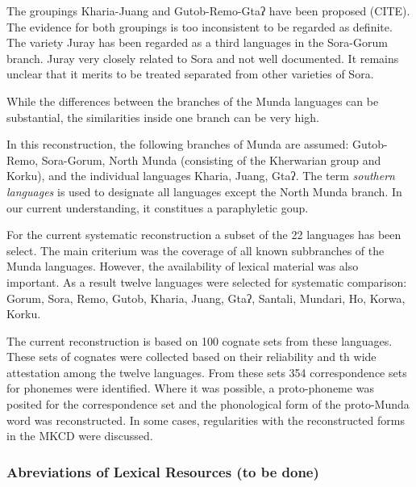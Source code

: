 \documentclass[a4paper,]{article}
\begin{document}
The groupings Kharia-Juang and Gutob-Remo-Gtaʔ have been proposed
(CITE). The evidence for both groupings is too inconsistent to be
regarded as definite. The variety Juray has been regarded as a third
languages in the Sora-Gorum branch. Juray very closely related to Sora
and not well documented. It remains unclear that it merits to be treated
separated from other varieties of Sora.

While the differences between the branches of the Munda languages can be
substantial, the similarities inside one branch can be very high.

In this reconstruction, the following branches of Munda are assumed:
Gutob-Remo, Sora-Gorum, North Munda (consisting of the Kherwarian group
and Korku), and the individual languages Kharia, Juang, Gtaʔ. The term
\emph{southern languages} is used to designate all languages except the
North Munda branch. In our current understanding, it constitues a
paraphyletic goup.

For the current systematic reconstruction a subset of the 22 languages
has been select. The main criterium was the coverage of all known
subbranches of the Munda languages. However, the availability of lexical
material was also important. As a result twelve languages were selected
for systematic comparison: Gorum, Sora, Remo, Gutob, Kharia, Juang,
Gtaʔ, Santali, Mundari, Ho, Korwa, Korku.

The current reconstruction is based on 100 cognate sets from these
languages. These sets of cognates were collected based on their
reliability and th wide attestation among the twelve languages. From
these sets 354 correspondence sets for phonemes were identified. Where
it was possible, a proto-phoneme was posited for the correspondence set
and the phonological form of the proto-Munda word was reconstructed. In
some cases, regularities with the reconstructed forms in the MKCD were
discussed.

\subsubsection{Abreviations of Lexical Resources (to be
done)}\label{abreviations-of-lexical-resources-to-be-done}
\end{document}
